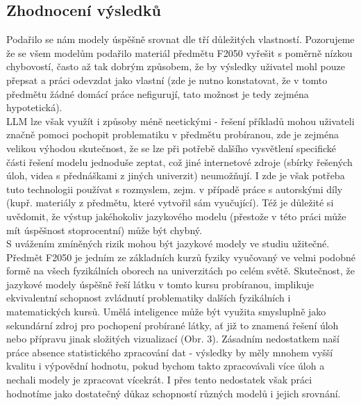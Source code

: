 \documentclass[czech,11pt,a4paper]{article}
\begin{document}
\begin{multicols}{2}
		\section{Zhodnocení výsledků}
		Podařilo se nám modely úspěšně srovnat dle tří důležitých vlastností. Pozorujeme že se všem modelům podařilo materiál předmětu F2050 vyřešit s poměrně nízkou chybovostí, často až tak dobrým způsobem, že by výsledky uživatel mohl pouze přepsat a práci odevzdat jako vlastní (zde je nutno konstatovat, že v tomto předmětu žádné domácí práce nefigurují, tato možnost je tedy zejména hypotetická). \\LLM lze však využít i způsoby méně neetickými - řešení příkladů mohou uživateli značně pomoci pochopit problematiku v předmětu probíranou, zde je zejména velikou výhodou skutečnost, že se lze při potřebě dalšího vysvětlení specifické části řešení modelu jednoduše zeptat, což jiné internetové zdroje (sbírky řešených úloh, videa s přednáškami z jiných univerzit) neumožňují. I zde je však potřeba tuto technologii používat s rozmyslem, zejm. v případě práce s autorskými díly (kupř. materiály z předmětu, které vytvořil sám vyučující). Též je důležité si uvědomit, že výstup jakéhokoliv jazykového modelu (přestože v této práci může mít úspěšnost stoprocentní) může být chybný.  \\
		S uvážením zmíněných rizik mohou být jazykové modely ve studiu užitečné. Předmět F2050 je jedním ze základních kurzů fyziky vyučovaný ve velmi podobné formě na všech fyzikálních oborech na univerzitách po celém světě. Skutečnost, že jazykové modely úspěšně řeší látku v tomto kursu probíranou, implikuje ekvivalentní schopnost zvládnutí problematiky dalších fyzikálních i matematických kursů. Umělá inteligence může být využita smysluplně jako sekundární zdroj pro pochopení probírané látky, ať již to znamená řešení úloh nebo přípravu jinak složitých vizualizací (Obr. 3). Zásadním nedostatkem naší práce absence statistického zpracování dat - výsledky by měly mnohem vyšší kvalitu i výpovědní hodnotu, pokud bychom takto zpracovávali více úloh a nechali modely je zpracovat vícekrát. I přes tento nedostatek však práci hodnotíme jako dostatečný důkaz schopností různých modelů i jejich srovnání.
			\begin{figure}[H]
			\centering

\end{figure}
\end{multicols}
\end{document}
